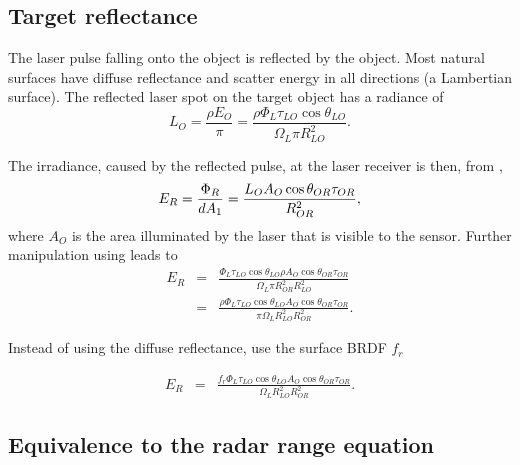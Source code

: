 \subsection{Target reflectance}
\noindent
The laser pulse falling onto the object is reflected by the object. Most
natural surfaces have diffuse reflectance and scatter energy in all
directions (a Lambertian surface). The reflected laser spot on the target object has a radiance of
\begin{equation}
L_O=\frac{\rho E_O}{\pi}=\frac{\rho\Phi_L \tau_{LO}\cos\theta_{LO}}{\Omega_L
\pi R^2_{LO}}.\label{loo}
\end{equation}



The irradiance, caused by the reflected pulse, at the laser receiver is then, from ,
\begin{equation}
E_R=\frac{\Phi_R}{d A_1}=\frac{L_O A_O \cos\theta_{OR}\tau_{OR}}{R_{OR}^2},
\end{equation}
where $A_O$ is the area illuminated by the laser that is visible to the
sensor. Further manipulation using  leads to
\begin{eqnarray}
E_R&=&\frac{\Phi_L \tau_{LO}\cos\theta_{LO}\rho A_O \cos\theta_{OR}\tau_{OR}}
{\Omega_L \pi R^2_{OR}R^2_{LO}}\nonumber \\
&=&\frac{
\rho \Phi_L \tau_{LO} \cos\theta_{LO} A_O \cos\theta_{OR} \tau_{OR}
}{
\pi \Omega_L R^2_{LO}R^2_{OR}
}.
\end{eqnarray}

Instead of using the diffuse reflectance, use the surface BRDF $f_r$

\begin{eqnarray}
E_R&=&\frac{
f_r \Phi_L \tau_{LO} \cos\theta_{LO} A_O \cos\theta_{OR} \tau_{OR}
}{
\Omega_L R^2_{LO}R^2_{OR}
}\label{erbrdf}.
\end{eqnarray}


\subsection{Equivalence to the radar range equation}


